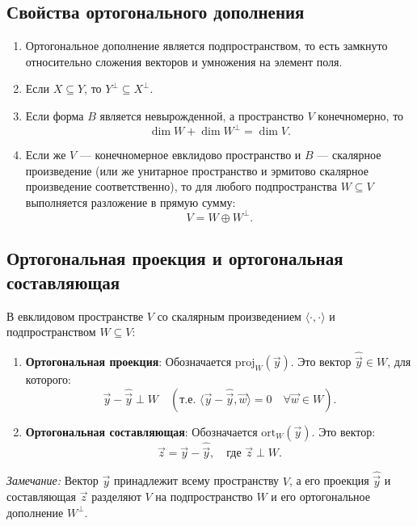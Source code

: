 \documentclass[12pt]{article}
\begin{document}
\subsection*{Свойства ортогонального дополнения}

\begin{enumerate}
    \item Ортогональное дополнение является подпространством, то есть замкнуто относительно сложения векторов и умножения на элемент поля.
    \item Если $X \subseteq Y$, то $Y^\perp \subseteq X^\perp$.
    \item Если форма $B$ является невырожденной, а пространство $V$ конечномерно, то  
    $$
    \dim W + \dim W^\perp = \dim V.
    $$
    \item Если же $V$ — конечномерное евклидово пространство и $B$ — скалярное произведение (или же унитарное пространство и эрмитово скалярное произведение соответственно), то для любого подпространства $W \subseteq V$ выполняется разложение в прямую сумму:
    $$
    V = W \oplus W^\perp.
    $$
\end{enumerate}

\subsection*{Ортогональная проекция и ортогональная составляющая}
В евклидовом пространстве $V$ со скалярным произведением $\langle \cdot, \cdot \rangle$ и подпространством $W \subseteq V$:

\begin{enumerate}
    \item \textbf{Ортогональная проекция}:  
    Обозначается $\mathrm{proj}_W(\vec{y})$. Это вектор $\hat{\vec{y}} \in W$, для которого:
    $$
    \vec{y} - \hat{\vec{y}} \perp W \quad (\text{т.е. } \langle \vec{y} - \hat{\vec{y}}, \vec{w} \rangle = 0 \quad \forall \vec{w} \in W).
    $$
    
    \item \textbf{Ортогональная составляющая}:  
    Обозначается $\mathrm{ort}_W(\vec{y})$. Это вектор:
    $$
    \vec{z} = \vec{y} - \hat{\vec{y}}, \quad \text{где } \vec{z} \perp W.
    $$
\end{enumerate}

\textit{Замечание:} Вектор $\vec{y}$ принадлежит всему пространству $V$, а его проекция $\hat{\vec{y}}$ и составляющая $\vec{z}$ разделяют $V$ на подпространство $W$ и его ортогональное дополнение $W^\perp$.
\end{document}

